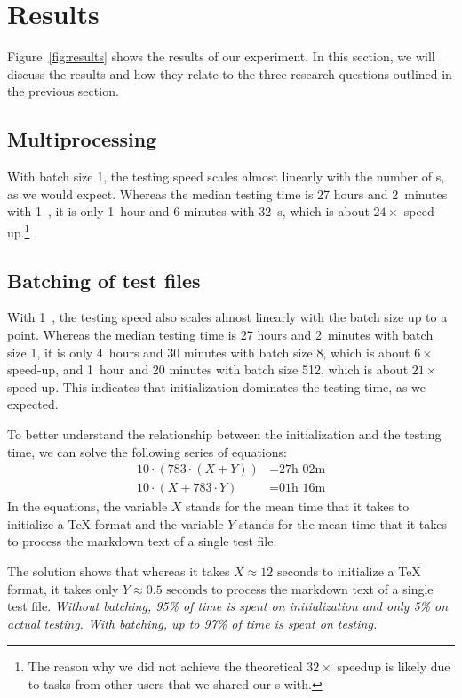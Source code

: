 \documentclass[final]{ltugboat}
\begin{document}
\section{Results}
\label{sec:results}

Figure~\ref{fig:results} shows the results of our experiment. In this section, we will discuss the results and how they relate to the three research questions outlined in the previous section.

\subsection{Multiprocessing}
With batch size 1, the testing speed scales almost linearly with the number of s, as we would expect. Whereas the median testing time is 27 hours and 2~minutes with 1~, it is only 1~hour and 6 minutes with 32~s, which is about $24\times$ speed-up.\footnote{The reason why we did not achieve the theoretical $32\times$ speedup is likely due to tasks from other users that we shared our s with.}

\subsection{Batching of test files}
With 1~, the testing speed also scales almost linearly with the batch size up to a point. Whereas the median testing time is 27 hours and 2~minutes with batch size 1, it is only 4~hours and 30 minutes with batch size 8, which is about $6\times$ speed-up, and 1~hour and 20 minutes with batch size 512, which is about $21\times$ speed-up. This indicates that initialization dominates the testing time, as we expected.

To better understand the relationship between the initialization and the testing time, we can solve the following series of equations:
\begin{align*}
    10\cdot(783\cdot(X + Y)) &= \text{27h 02m} \tag{Batch size 1} \\
    10\cdot(X + 783\cdot Y) &= \text{01h 16m}  \tag{Batch size 1024}
\end{align*}
In the equations, the variable $X$ stands for the mean time that it takes to initialize a \TeX{} format and the variable $Y$ stands for the mean time that it takes to process the markdown text of a single test file.

The solution shows that whereas it takes $X\approx\text{12 seconds}$ to initialize a \TeX{} format, it takes only $Y\approx\text{0.5 seconds}$ to process the markdown text of a single test file. \emph{Without batching, 95\% of time is spent on initialization and only 5\% on actual testing. With batching, up to 97\% of time is spent on testing.}
\end{document}
